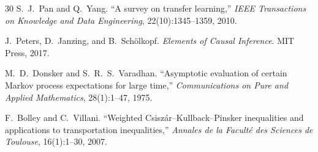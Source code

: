 \documentclass[12pt,a4paper]{article}
\begin{document}
\begin{thebibliography}{30}
S.~J.~Pan and Q.~Yang.
\newblock ``A survey on transfer learning,''
\newblock \emph{IEEE Transactions on Knowledge and Data Engineering},
22(10):1345--1359, 2010.

J.~Peters, D.~Janzing, and B.~Sch\"olkopf.
\newblock \emph{Elements of Causal Inference}.
\newblock MIT Press, 2017.

M.~D.~Donsker and S.~R.~S.~Varadhan.
\newblock ``Asymptotic evaluation of certain Markov process expectations
for large time,''
\newblock \emph{Communications on Pure and Applied Mathematics},
28(1):1--47, 1975.

F.~Bolley and C.~Villani.
\newblock ``Weighted Csisz\'ar--Kullback--Pinsker inequalities and
applications to transportation inequalities,''
\newblock \emph{Annales de la Facult\'e des Sciences de Toulouse},
16(1):1--30, 2007.

\end{thebibliography}
\end{document}
